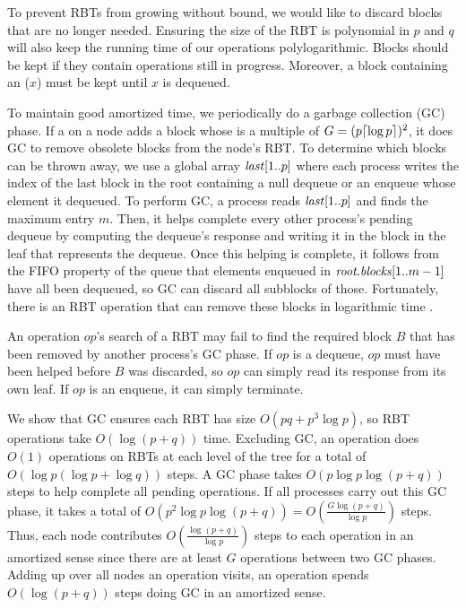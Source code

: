 To prevent RBTs from growing without bound, we would like to discard
blocks that are no longer needed.
Ensuring the size of the RBT is polynomial in $p$ and $q$ will 
also keep the running time of our operations polylogarithmic.
Blocks should be kept if they contain operations still in progress.
Moreover, a block containing an ($x$) must be kept until $x$ is dequeued.

To maintain good amortized time, we periodically do a garbage collection (GC) phase.
If a  on a node adds a block whose  is a multiple of $G=(p\lceil \log p \rceil)^2$, it does GC to remove obsolete blocks from the node's RBT.
To determine which blocks can be thrown away, we use a global array $\mbox{\textnormal{\textit{last}}}[1..p]$ where 
each process writes the index of the last block in the root
containing a null dequeue or an enqueue whose element it dequeued.
To perform GC, a process reads $\mbox{\textnormal{\textit{last}}}[1..p]$ and finds the maximum entry $m$.
Then, it helps complete every other process's pending dequeue 
by computing the dequeue's response and writing it in the block in the leaf that represents the dequeue.
Once this helping is complete, it follows from the FIFO property of the queue that elements enqueued 
in $\mbox{\textit{root.blocks}}[1..m-1]$ have all been dequeued, so GC can discard all subblocks of those.
Fortunately, there is an  RBT  operation that can remove
these blocks in logarithmic time \cite[Sec.~4.2]{Tar83}.

An operation $op$'s search of a RBT may fail to find the required block $B$ that has been removed 
by another process's GC phase.  If $op$
is a dequeue, $op$ must have been helped before $B$ was discarded, so $op$ can simply read its response from
its own leaf.  If $op$ is an enqueue, it can simply terminate.

We show that GC ensures each RBT has size $O(pq+p^3\log p)$, so RBT operations take $O(\log(p+q))$ time.
Excluding GC, an operation does $O(1)$ operations on RBTs at each level of the tree for a total of
$O(\log p(\log p +\log q))$ steps.
A GC phase takes $O(p\log p \log(p+q))$ steps to help complete all pending operations.
If all processes carry out this GC phase, it takes a total of $O(p^2\log p\log(p+q))=O(\frac{G\log(p+q)}{\log p})$ steps.
Thus, each node contributes $O(\frac{\log(p+q)}{\log p})$ steps to each operation in an amortized sense
since there are at least $G$ operations between two GC phases.
Adding up over all nodes an operation visits, 
an operation spends $O(\log(p+q))$ steps doing GC in an amortized sense.

